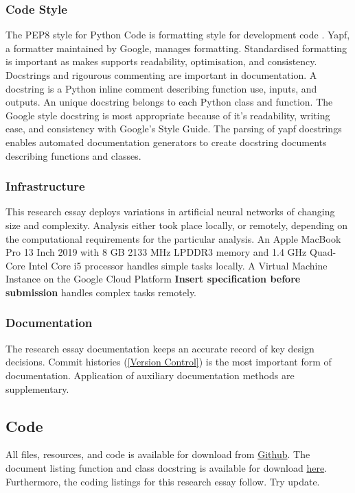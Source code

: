 \documentclass[12pt]{article}
\begin{document}
{\subsubsection{Code Style} \label{CS}
The PEP8 style for Python Code is formatting style for development code \cite{PEP8}. 
Yapf, a formatter maintained by Google, manages formatting.
Standardised formatting is important as makes supports readability, optimisation, and consistency.
Docstrings and rigourous commenting are important in documentation. 
A docstring is a Python inline comment describing function use, inputs, and outputs.
An unique docstring belongs to each Python class and function. 
The Google style docstring is most appropriate because of it's readability, writing ease, and consistency with Google's Style Guide.
The parsing of yapf docstrings enables automated documentation generators to create docstring documents describing functions and classes.

\subsubsection{Infrastructure}
This research essay deploys variations in artificial neural networks of changing size and complexity.
Analysis either took place locally, or remotely, depending on the computational requirements for the particular analysis.
An Apple MacBook Pro 13 Inch 2019 with 8 GB 2133 MHz LPDDR3 memory and 1.4 GHz Quad-Core Intel Core i5 processor handles simple tasks locally.
A Virtual Machine Instance on the Google Cloud Platform \textbf{Insert specification before submission} handles complex tasks remotely.

\subsubsection{Documentation}
The research essay documentation keeps an accurate record of key design decisions.
Commit histories (\ref{Version Control}) is the most important form of documentation.
Application of auxiliary documentation methods are supplementary.
\subsection{Code} \label{code}
All files, resources, and code is available for download from \href{https://github.com/CMCD1996/finance-honours}{Github}.
The document listing function and class docstring is available for download \href{/Users/connor/Google Drive/Documents/Professional/Projects/Portfolio/downloads/wip.pdf}{here}.
Furthermore, the coding listings for this research essay follow. Try update.
% 
}
\end{document}
